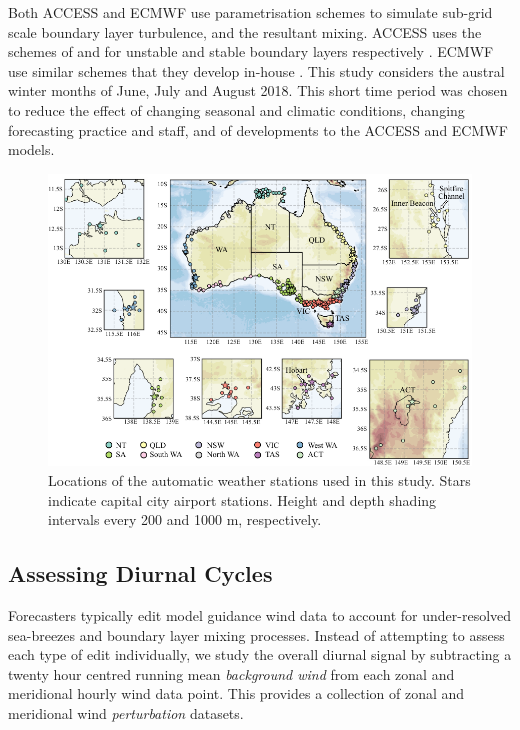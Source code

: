 \documentclass{ametsoc}
\begin{document}
Both ACCESS and ECMWF use parametrisation schemes to simulate sub-grid scale boundary layer turbulence, and the resultant mixing. ACCESS uses the schemes of \citet{lock00} and \citet{louis79} for unstable and stable boundary layers respectively \citep{bom10}. ECMWF use similar schemes that they develop in-house \citep{ecmwf18}. This study considers the austral winter months of June, July and August 2018. This short time period was chosen to reduce the effect of changing seasonal and climatic conditions, changing forecasting practice and staff, and of developments to the ACCESS and ECMWF models.

\begin{figure}
\centering
\includegraphics[width=39pc]{map.pdf}
\caption{Locations of the automatic weather stations used in this study. Stars indicate capital city airport stations. Height and depth shading intervals every 200 and 1000 m, respectively.}
\label{Fig:map}
\end{figure}

\subsection{Assessing Diurnal Cycles}
Forecasters typically edit model guidance wind data to account for under-resolved sea-breezes and boundary layer mixing processes. Instead of attempting to assess each type of edit individually, we study the overall diurnal signal by subtracting a twenty hour centred running mean \textit{background wind} from each zonal and meridional hourly wind data point. This provides a collection of zonal and meridional wind \emph{perturbation} datasets. 
\end{document}
